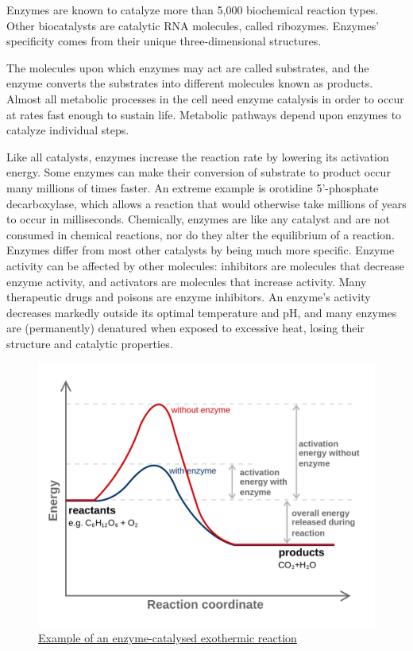 Enzymes are known to catalyze more than 5,000 biochemical reaction types. Other biocatalysts are catalytic RNA molecules, called ribozymes. Enzymes' specificity comes from their unique three-dimensional structures.

The molecules upon which enzymes may act are called substrates, and the enzyme converts the substrates into different molecules known as products. Almost all metabolic processes in the cell need enzyme catalysis in order to occur at rates fast enough to sustain life. Metabolic pathways depend upon enzymes to catalyze individual steps.

Like all catalysts, enzymes increase the reaction rate by lowering its activation energy. Some enzymes can make their conversion of substrate to product occur many millions of times faster. An extreme example is orotidine 5'-phosphate decarboxylase, which allows a reaction that would otherwise take millions of years to occur in milliseconds. Chemically, enzymes are like any catalyst and are not consumed in chemical reactions, nor do they alter the equilibrium of a reaction. Enzymes differ from most other catalysts by being much more specific. Enzyme activity can be affected by other molecules: inhibitors are molecules that decrease enzyme activity, and activators are molecules that increase activity. Many therapeutic drugs and poisons are enzyme inhibitors. An enzyme's activity decreases markedly outside its optimal temperature and pH, and many enzymes are (permanently) denatured when exposed to excessive heat, losing their structure and catalytic properties.



\begin{figure}

{\centering \includegraphics[width=0.7\linewidth]{./figures/bioenergetics/Activation2_updated} 

}

\caption{\href{https://commons.wikimedia.org/wiki/File:Activation2_updated.svg}{Example of an enzyme-catalysed exothermic reaction}}\label{fig:activationenergy}
\end{figure}

